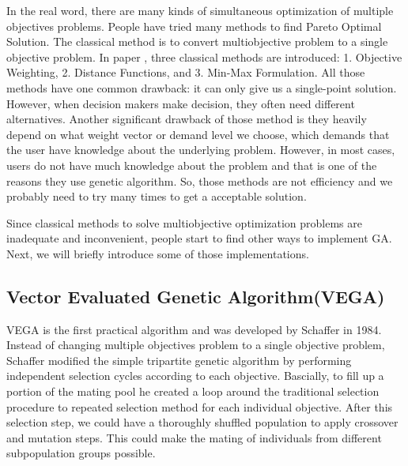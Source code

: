 In the real word, there are many kinds of simultaneous optimization of multiple objectives problems. People have tried many methods to find Pareto Optimal Solution. The classical method is to convert multiobjective problem to a single objective problem. In paper \cite{NSGA_1994}, three classical methods are introduced: 1. Objective Weighting, 2. Distance Functions, and 3. Min-Max Formulation. All those methods have one common drawback: it can only give us a single-point solution. However, when decision makers make decision, they often need different alternatives. Another significant drawback of those method is they heavily depend on what weight vector or demand level we choose, which demands that the user have knowledge about the underlying problem. However, in most cases, users do not have much knowledge about the problem and that is one of the reasons they use genetic algorithm. So, those methods are not efficiency and we probably need to try many times to get a acceptable solution.

Since classical methods to solve multiobjective optimization problems are inadequate and inconvenient, people start to find other ways to implement GA. Next, we will briefly introduce some of those implementations.

\subsection{Vector Evaluated Genetic Algorithm(VEGA)}
VEGA is the first practical algorithm and was developed by Schaffer in 1984\cite{Schaffer_1984_Some}. Instead of changing multiple objectives problem to a single objective problem, Schaffer modified the simple tripartite genetic algorithm by performing independent selection cycles according to each objective\cite{Schaffer_1984_Some}. Bascially, to fill up a portion of the mating pool he created a loop around the traditional selection procedure to repeated selection method for each individual objective. After this selection step, we could have a thoroughly shuffled population to apply crossover and mutation steps. This could make the mating of individuals from different subpopulation groups possible.

